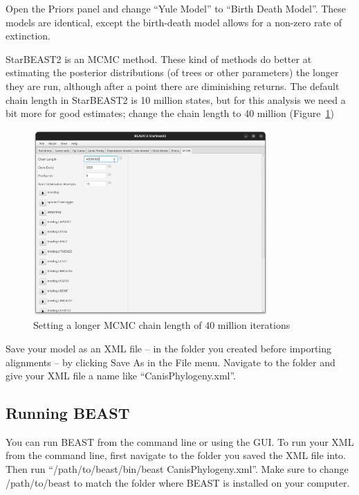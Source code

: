 \documentclass[12pt]{article}
\begin{document}
Open the Priors panel and change ``Yule Model'' to ``Birth Death Model''.
These models are identical, except the birth-death model allows for a
non-zero rate of extinction.

StarBEAST2 is an MCMC method. These kind of methods do better at estimating
the posterior distributions (of trees or other parameters) the longer they
are run, although after a point there are diminishing returns. The default
chain length in StarBEAST2 is 10 million states, but for this analysis we
need a bit more for good estimates; change the chain length to 40 million
(Figure~\ref{fig:chainLength})

\begin{figure}[htb!]
\centering
\includegraphics[width=0.8\textwidth]{figures/chainLength.png}
\caption
{Setting a longer MCMC chain length of 40 million iterations}
\label{fig:chainLength}
\end{figure}

Save your model as an XML file -- in the folder you created before importing
alignments -- by clicking Save As in the File menu. Navigate to the folder
and give your XML file a name like ``CanisPhylogeny.xml''.

\subsection{Running BEAST}
\label{subsec:runningBEAST}

You can run BEAST from the command line or using the GUI. To run your XML
from the command line, first navigate to the folder you saved the XML file into.
Then run ``/path/to/beast/bin/beast CanisPhylogeny.xml''. Make sure to change
/path/to/beast to match the folder where BEAST is installed on your computer.
\end{document}
